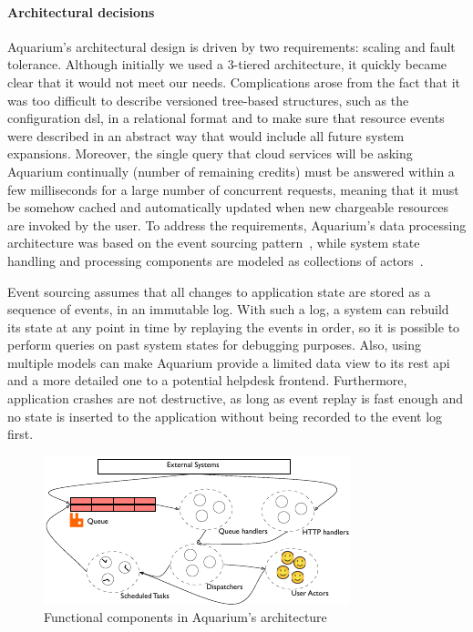 \paragraph{Architectural decisions} Aquarium's
architectural design is driven by two requirements: scaling and fault
tolerance. Although initially we used a 3-tiered architecture, it quickly became clear
that it would not meet our needs.
Complications arose from the fact that it was too difficult to describe
versioned tree-based structures, such as the configuration {\sc dsl},
in a relational format and to
make sure that resource events were described in an abstract way that would
include all future system expansions. Moreover, the single query that cloud
services will be asking Aquarium continually (number of remaining credits) must
be answered within a few milliseconds for a large number of
concurrent requests, meaning that it must be somehow cached and
automatically updated when new chargeable resources are invoked by the user.
To address the requirements, Aquarium's data processing architecture was
based on the event sourcing
pattern~\cite{Fowle05}, while system state handling and processing components
are modeled as collections of actors~\cite{Hewit73}.

Event sourcing assumes that all changes to application
state are stored as a sequence of events, in an immutable log. With such a log,
a system can rebuild its state at any point in time by replaying the
events in order, so it is possible to perform queries on past system states for
debugging purposes. Also, using multiple models can make Aquarium  provide a limited data view to its {\sc rest api} and a more detailed one to a potential helpdesk
frontend. Furthermore, application crashes are not destructive, as long as
event replay is fast enough and no state is inserted to the application without
being recorded to the event log first.

\begin{figure}
    \begin{center}
    \includegraphics[scale=1.2]{arch.pdf}
    \end{center}
\caption{Functional components in Aquarium's architecture} 
\label{fig:arch}
\end{figure}

